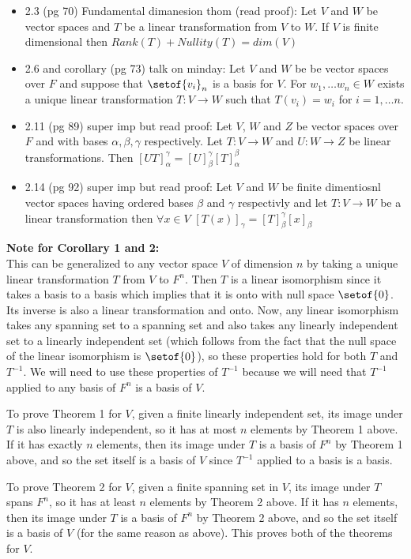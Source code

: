 \documentclass[answers,12pt,addpoints]{exam}
\begin{document}
\begin{itemize}
    \item 2.3 (pg 70) Fundamental dimanesion thom (read proof): Let $V$ and $W$ be vector spaces and $T$ be a linear transformation from $V$ to $W$. If $V$ is finite dimensional then $Rank(T) + Nullity(T) = dim(V)$
    \item 2.6 and corollary (pg 73) talk on minday: Let $V$ and $W$ be be vector spaces over $F$ and suppose that $\setof{v_i}_n$ is a basis for $V$. For $w_1, \dots w_n \in W$ exists a unique linear transformation $T: V \to W$ such that $T(v_i) = w_i$ for $i = 1, \dots n$.
    \item 2.11 (pg 89) super imp but read proof: Let $V$, $W$ and $Z$ be vector spaces over $F$ and with bases $\alpha, \beta, \gamma$ respectively. Let $T: V \to W$ and $U: W \to Z$ be linear transformations. Then $ [UT]_{\alpha}^{\gamma} = [U]_{\beta}^{\gamma}[T]_{\alpha}^{\beta}$
    \item 2.14 (pg 92) super imp but read proof: Let $V$ and $W$ be finite dimentiosnl vector spaces having ordered bases $\beta$ and $\gamma$ respectivly and let $T:V \to W$ be a linear transformation then $\forall x \in V$ $ [T(x)]_{\gamma} = [T]_{\beta}^{\gamma}[x]_{\beta}$
 \end{itemize}

\textbf{Note for Corollary 1 and 2:}\\
 This can be generalized to any vector space $V$ of dimension $n$ by taking a unique linear transformation $T$ from $V$ to $F^n$. Then $T$ is a linear isomorphism since it takes a basis to a basis which implies that it is onto with null space $\setof{0}$. Its inverse is also a linear transformation and onto. Now, any linear isomorphism takes any spanning set to a spanning set and also takes any linearly independent set to a linearly independent set (which follows from the fact that the null space of the linear isomorphism is $\setof{0}$), so these properties hold for both $T$ and $T^{-1}$. We will need to use these properties of $T^{-1}$ because we will need that $T^{-1}$ applied to any basis of $F^n$ is a basis of $V$.

        To prove Theorem 1 for $V$, given a finite linearly independent set, its image under $T$ is also linearly independent, so it has at most $n$ elements by Theorem 1 above. If it has exactly $n$ elements, then its image under $T$ is a basis of $F^n$ by Theorem 1 above, and so the set itself is a basis of $V$ since $T^{-1}$ applied to a basis is a basis.

        To prove Theorem 2 for $V$, given a finite spanning set in $V$, its image under $T$ spans $F^n$, so it has at least $n$ elements by Theorem 2 above. If it has $n$ elements, then its image under $T$ is a basis of $F^n$ by Theorem 2 above, and so the set itself is a basis of $V$ (for the same reason as above). This proves both of the theorems for $V$.
\end{document}
